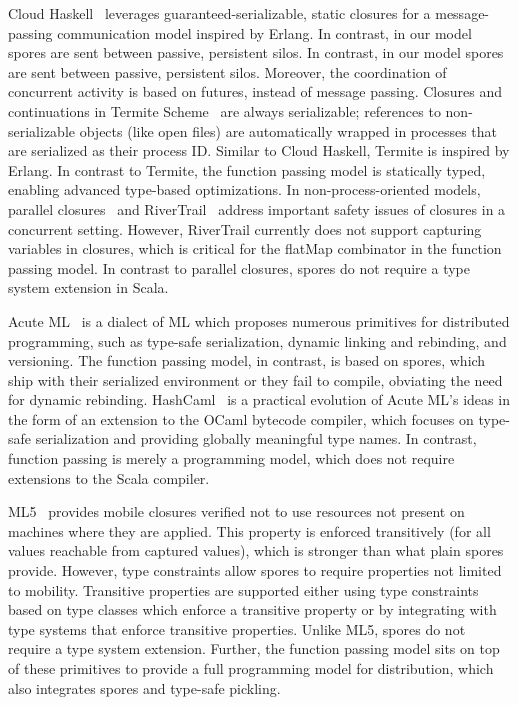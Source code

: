 \documentclass[10pt]{sigplanconf}
\theoremstyle{definition}
\theoremstyle{definition}
\begin{document}
Cloud Haskell~\cite{CloudHaskell} leverages guaranteed-serializable, static
closures for a message-passing communication model inspired by Erlang. In
contrast, in our model spores are sent between passive, persistent silos. In
contrast, in our model spores are sent between passive, persistent silos.
Moreover, the coordination of concurrent activity is based on futures, instead
of message passing. Closures and continuations in Termite
Scheme~\cite{TermiteScheme} are always serializable; references to non-serializable
objects (like open files) are automatically wrapped in processes
that are serialized as their process ID. Similar to Cloud Haskell, Termite is
inspired by Erlang. In contrast to Termite, the function passing model is statically typed, enabling
advanced type-based optimizations. In non-process-oriented models, parallel
closures~\cite{ParallelClosures} and RiverTrail~\cite{RiverTrail} address
important safety issues of closures in a concurrent setting. However,
RiverTrail currently does not support capturing variables in closures, which is
critical for the flatMap combinator in the function passing model. In contrast to parallel closures,
spores do not require a type system extension in Scala.

Acute ML~\cite{AcuteML} is a dialect of ML which proposes numerous primitives
for distributed programming, such as type-safe serialization, dynamic linking
and rebinding, and versioning. The function passing model, in contrast, is based on spores, which ship
with their serialized environment or they fail to compile, obviating the need
for dynamic rebinding. HashCaml~\cite{DistOCaml} is a practical evolution of
Acute ML's ideas in the form of an extension to the OCaml bytecode compiler,
which focuses on type-safe serialization and providing globally meaningful type
names. In contrast, function passing is merely a programming model, which does not require
extensions to the Scala compiler.


ML5~\cite{Tom7} provides mobile closures verified not to use resources not
present on machines where they are applied. This property is enforced
transitively (for all values reachable from captured values), which is stronger
than what plain spores provide. However, type constraints allow spores to
require properties not limited to mobility. Transitive properties are supported
either using type constraints based on type classes which enforce a transitive
property or by integrating with type systems that enforce transitive
properties. Unlike ML5, spores do not require a type system extension. Further,
the function passing model sits on top of these primitives to provide a full programming
model for distribution, which also integrates spores and type-safe pickling.
\end{document}
